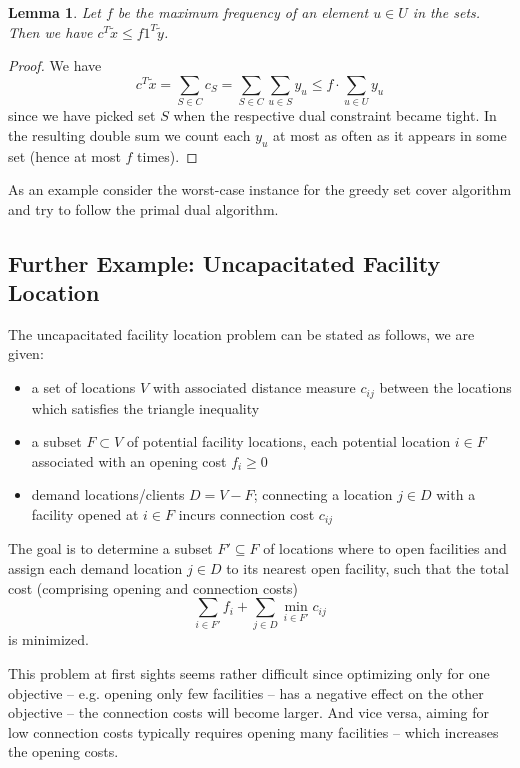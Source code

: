 \documentclass{article}
\newtheorem{lemma}{Lemma}
\begin{document}
\begin{lemma}
Let $f$ be the maximum frequency of an element $u\in U$ in the sets. Then we have 
$c^T\widetilde{x}\leq f 1^T\widetilde{y}$.
\end{lemma}
\begin{proof}
We have
\[
	c^T\widetilde{x} = \sum_{S\in C} c_S = \sum_{S\in C} \sum_{u\in S} y_u \leq f \cdot \sum_{u\in U} y_u
\]
since we have picked set $S$ when the respective dual constraint became tight. In the resulting double sum we count each $y_u$ at most as often as it appears in some set (hence at most $f$ times).
\end{proof}

As an example consider the worst-case instance for the greedy set cover algorithm and try to follow the primal dual algorithm.



\subsection{Further Example: Uncapacitated Facility Location}

The uncapacitated facility location problem can be stated as follows, we are given:
\begin{itemize}
\item a set of locations $V$ with associated distance measure $c_{ij}$ between the locations which satisfies the triangle inequality
\item a subset $F\subset V$ of potential facility locations, each potential location $i\in F$ associated with an opening cost $f_i\geq 0$
\item demand locations/clients $D=V-F$; connecting a location $j\in D$ with a facility opened at $i\in F$ incurs connection cost $c_{ij}$ 
\end{itemize}

The goal is to determine a subset $F'\subseteq F$ of locations where to open facilities and assign each demand location $j\in D$ to its nearest open facility, such that the total cost (comprising opening and connection costs)
\[
	\sum_{i\in F'} f_i + \sum_{j\in D} \min_{i\in F'} c_{ij}
\] 
is minimized.

This problem at first sights seems rather difficult since optimizing only for one objective -- e.g. opening only few facilities -- has a negative effect on the other objective -- the connection costs will become larger. And vice versa, aiming for low connection costs typically requires opening many facilities -- which increases the opening costs.
\end{document}
